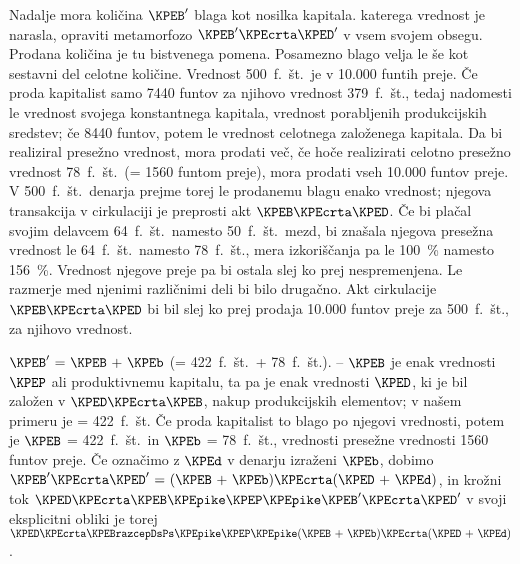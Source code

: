 \documentclass[kapital_02.tex]{subfiles}
\begin{document}
Nadalje mora količina \(\KPEB'\) blaga kot nosilka kapitala. katerega vrednost je narasla, opraviti metamorfozo \(\KPEB'\KPEcrta\KPED'\) v vsem svojem obsegu. Prodana količina je tu bistvenega pomena. Posamezno blago velja le še kot sestavni del celotne količine. Vrednost 500\ f.\ št.\ je v 10.000 funtih preje. Če proda kapitalist samo 7440 funtov za njihovo vrednost 379\ f.\ št., tedaj nadomesti le vrednost svojega konstantnega kapitala, \KPEstran vrednost porabljenih produkcijskih sredstev; če 8440 funtov, potem le vrednost celotnega založenega kapitala. Da bi realiziral presežno vrednost, mora prodati več, če hoče realizirati celotno presežno vrednost 78\ f.\ št.\ (= 1560 funtom preje), mora prodati vseh 10.000 funtov preje. V 500\ f.\ št.\ denarja prejme torej le prodanemu blagu enako vrednost; njegova transakcija v cirkulaciji je preprosti akt \(\KPEB\KPEcrta\KPED\). Če bi plačal svojim delavcem 64\ f.\ št.\ namesto 50\ f.\ št.\ mezd, bi znašala njegova presežna vrednost le 64\ f.\ št.\ namesto 78\ f.\ št., mera izkoriščanja pa le 100~\% namesto 156~\%. Vrednost njegove preje pa bi ostala slej ko prej nespremenjena. Le razmerje med njenimi različnimi deli bi bilo drugačno. Akt cirkulacije \(\KPEB\KPEcrta\KPED\) bi bil slej ko prej prodaja 10.000 funtov preje za 500\ f.\ št., za njihovo vrednost.

\(\KPEB' \textrm{ = } \KPEB \textrm{ + } \KPEb\) (= 422\ f.\ št.\ + 78\ f.\ št.). -- \(\KPEB\) je enak vrednosti \(\KPEP\) ali produktivnemu kapitalu, ta pa je enak vrednosti \(\KPED\), ki je bil založen v \(\KPED\KPEcrta\KPEB\), nakup produkcijskih elementov; v našem primeru je = 422\ f.\ št. Če proda kapitalist to blago po njegovi vrednosti, potem je \(\KPEB\) = 422\ f.\ št.\ in \(\KPEb\) = 78\ f.\ št., vrednosti presežne vrednosti 1560 funtov preje. Če označimo z \(\KPEd\) v denarju izraženi \(\KPEb\), dobimo \(\KPEB'\KPEcrta\KPED' \textrm{ = } (\KPEB \textrm{ + } \KPEb)\KPEcrta(\KPED\textrm{ + }\KPEd)\), in krožni tok \(\KPED\KPEcrta\KPEB\KPEpike\KPEP\KPEpike\KPEB'\KPEcrta\KPED'\) v svoji eksplicitni obliki je torej \(\KPED\KPEcrta\KPEBrazcepDsPs\KPEpike\KPEP\KPEpike(\KPEB \textrm{ + } \KPEb)\KPEcrta(\KPED \textrm{ + } \KPEd)\).
\end{document}

